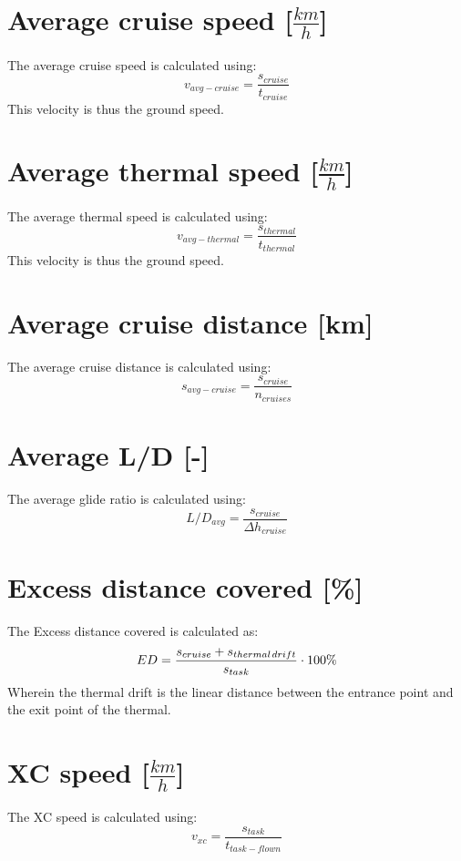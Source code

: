 \section{Average cruise speed [$\frac{km}{h}$]}
The average cruise speed is calculated using:
\begin{equation}
{v_{avg - cruise}} = \frac{{{s_{cruise}}}}{{{t_{cruise}}}}
\end{equation}
This velocity is thus the ground speed.

\section{Average thermal speed [$\frac{km}{h}$]}
The average thermal speed is calculated using:
\begin{equation}
{v_{avg - thermal}} = \frac{{{s_{thermal}}}}{{{t_{thermal}}}}
\end{equation}
This velocity is thus the ground speed.

\section{Average cruise distance [km]}
The average cruise distance is calculated using:
\begin{equation}
{s_{avg - cruise}} = \frac{{{s_{cruise}}}}{{{n_{cruises}}}}
\end{equation}

\section{Average L/D [-]}
The average glide ratio is calculated using:
\begin{equation}
L/{D_{avg}} = \frac{{{s_{cruise}}}}{{\Delta {h_{cruise}}}}
\end{equation}

\section{Excess distance covered [\%]}
The Excess distance covered is calculated as:
\begin{equation}
ED = \frac{{{s_{cruise}} + {s_{thermal{\kern 1pt} drift}}}}{{{s_{task}}}} \cdot 100\% 
\end{equation}
Wherein the thermal drift is the linear distance between the entrance point and the exit point of the thermal.

\section{XC speed [$\frac{km}{h}$]}
The XC speed is calculated using:
\begin{equation}
{v_{xc}} = \frac{{{s_{task}}}}{{{t_{task - flown}}}}
\end{equation}

